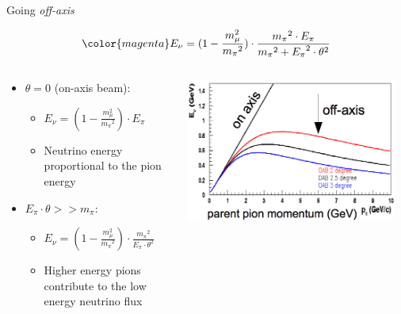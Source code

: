 {\begin{frame}{Going {\em off-axis}}
\begin{block}{}
\begin{equation*}
 {\color{magenta}
    E_{\nu}  = (1 - \frac{m_{\mu}^{2}} {{m_{\pi}}^{2}}) \cdot
               \frac {{m_{\pi}}^{2} \cdot E_{\pi}} {{m_{\pi}}^{2} + {E_{\pi}}^{2} \cdot {\theta}^{2}}
 }
\end{equation*}
\end{block}

\begin{columns}
  \begin{column}{0.50\textwidth}
    \begin{itemize}
      \item {\color{red} \bf $\theta = 0$} (on-axis beam): \\
        \begin{itemize}
          \item $\displaystyle E_{\nu}  = (1 - \frac{m_{\mu}^{2}} {{m_{\pi}}^{2}}) \cdot  E_{\pi}$
          \item Neutrino energy proportional to the pion energy
        \end{itemize}
      \item {\color{red} \bf $E_{\pi} \cdot \theta >> m_{\pi}$}: \\
        \begin{itemize}
          \item $\displaystyle E_{\nu}  = (1 - \frac{m_{\mu}^{2}} {{m_{\pi}}^{2}}) \cdot \frac {{m_{\pi}}^{2}} {E_{\pi} \cdot {\theta}^{2}}$
          \item Higher energy pions contribute to the low energy neutrino flux
        \end{itemize}
    \end{itemize}
  \end{column}
  \begin{column}{0.50\textwidth}
     \includegraphics[width=0.95\textwidth]{./images/3nu/accelerator/offaxis_angle_epi_vs_enu_degrees.png}
  \end{column}
\end{columns}

\end{frame}

} %



